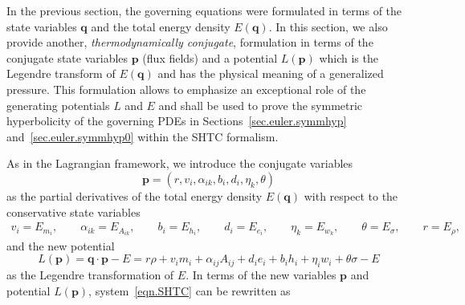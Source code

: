 \documentclass[twoside]{article}
\newcommand{\qq}{{\boldsymbol{q}}}
\newcommand{\pp}{{\boldsymbol{p}}}
\newcommand{\ted}{E} %
\begin{document}
In the previous section, the governing equations were formulated in terms of 
the state variables $ \qq $ and the total energy density $ \ted(\qq) $. In 
this section, we also provide another, \textit{thermodynamically conjugate}, 
formulation in terms 
of the conjugate state variables $ \pp 
$ (flux fields)  and a potential $ L(\pp) $ which is the 
Legendre transform of $ \ted(\qq) $ and has the physical 
meaning of a generalized 
pressure. This formulation allows to emphasize an exceptional role of the 
generating potentials $ L $  and $ \ted $ and shall be used to prove the 
symmetric hyperbolicity of the governing PDEs in 
Sections~\ref{sec.euler.symmhyp} and~\ref{sec.euler.symmhyp0} within the SHTC 
formalism.

As in the Lagrangian framework, we introduce the conjugate variables
\begin{equation}\label{eqn.p}
\pp=(r,v_i,\alpha_{ik},b_i,d_i,\eta_k,\theta)
\end{equation} 
as the partial derivatives of the 
total energy density $ \ted(\qq) $ with respect to the conservative state 
variables
\begin{equation*}
\begin{array}{c}
v_i=\ted_{m_i},\qquad  \alpha_{ik}=\ted_{A_{ik}},\qquad  
b_i=\ted_{h_i},\qquad d_i=\ted_{e_i}, \qquad
\eta_k=\ted_{w_k},\qquad \theta =\ted_{\sigma}, \qquad r=\ted_\rho,
\end{array} 
\end{equation*}
and the new potential 
\begin{equation}
L(\pp)=\qq\cdot\pp -\ted = r\rho + v_im_i + 
\alpha_{ij}A_{ij} + d_i e_i + b_i h_i + \eta_i w_i + \theta\sigma - \ted
\end{equation}
as the Legendre 
transformation of $ \ted $. In terms of the new variables $ \pp $ and potential 
$ L(\pp) $, system~\eqref{eqn.SHTC} can be 
rewritten as
\end{document}

